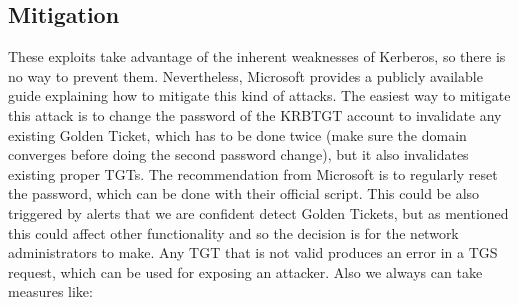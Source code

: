 \subsection{Mitigation}
These exploits take advantage of the inherent weaknesses of Kerberos, so there is no way to prevent them. Nevertheless, Microsoft provides a publicly available guide explaining how to mitigate this kind of attacks\cite{microsoft_mitigation}.
The easiest way to mitigate this attack is to change the password of the KRBTGT account to invalidate any existing Golden Ticket, which has to be done twice (make sure the domain converges before doing the second password change\cite{hood}), but it also invalidates existing proper TGTs.
\linej
The recommendation from Microsoft is to regularly reset the password, which can be done with their official script\cite{tarlogic_comprehension}\cite{adsecurity_483}\cite{reset_script}. This could be also triggered by alerts that we are confident detect Golden Tickets, but as mentioned this could affect other functionality and so the decision is for the network administrators to make. Any TGT that is not valid produces an error in a TGS request, which can be used for exposing an attacker\cite{scom_GT}.
\linej
\linej
Also we always can take measures like:
